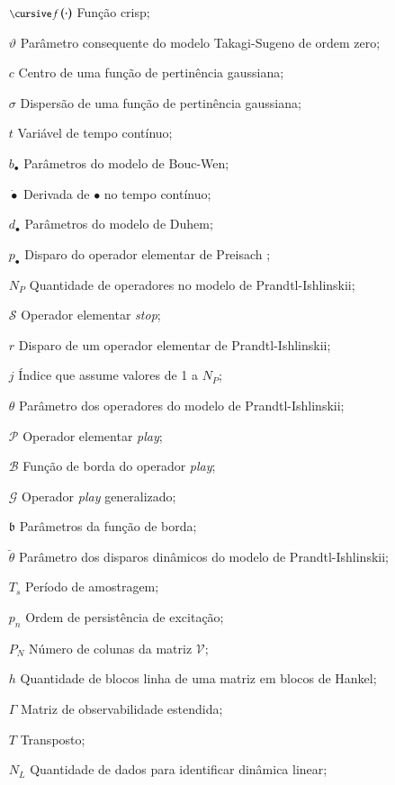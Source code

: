 \begin{itemize}[leftmargin=30pt,labelsep=1em,align=left]
	\item[$\textrm{\footnotesize \cursive \textit{f}}\,(\cdot)$] Função crisp;
	\item[$\vartheta$] Parâmetro consequente do modelo Takagi-Sugeno de ordem zero;
	\item[$c$] Centro de uma função de pertinência gaussiana;
	\item[$\sigma$] Dispersão de uma função de pertinência gaussiana;
	\item[$t$] Variável de tempo contínuo;
	\item[$b_\bullet$] Parâmetros do modelo de Bouc-Wen;
	\item[$\dot{\bullet}$] Derivada de $\bullet$ no tempo contínuo;
	\item[$d_\bullet$] Parâmetros do modelo de Duhem;
	\item[$p_\bullet$] Disparo do operador elementar de Preisach ;
	\item[$N_P$] Quantidade de operadores no modelo de Prandtl-Ishlinskii;
	\item[$\mathcal{S}$] Operador elementar \textit{stop};
	\item[$r$] Disparo de um operador elementar de Prandtl-Ishlinskii;
	\item[$j$] Índice que assume valores de 1 a $N_P$;
	\item[$\theta$] Parâmetro dos operadores do modelo de Prandtl-Ishlinskii;
	\item[$\mathcal{P}$] Operador elementar \textit{play};
	\item[$\mathcal{B}$] Função de borda do operador \textit{play};
	\item[$\mathcal{G}$] Operador \textit{play} generalizado;
	\item[$\mathfrak{b}$] Parâmetros da função de borda;
	\item[$\breve{\theta}$] Parâmetro dos disparos dinâmicos do modelo de Prandtl-Ishlinskii;
	\item[$T_s$] Período de amostragem;
	\item[$p_n$] Ordem de persistência de excitação;
	\item[$P_N$] Número de colunas da matriz $\mathcal{V}$;
	\item[$h$] Quantidade de blocos linha de uma matriz em blocos de Hankel;
	\item[$\Gamma$] Matriz de observabilidade estendida;
	\item[$T$] Transposto;
	\item[$N_L$] Quantidade de dados para identificar dinâmica linear;

\end{itemize}
